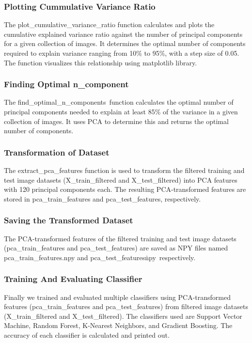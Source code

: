 \documentclass[a4paper]{article}
\theoremstyle{plain}
\theoremstyle{definition}
\begin{document}
        \subsubsection{Plotting Cummulative Variance Ratio}
        The plot\_cumulative\_variance\_ratio function calculates and plots the cumulative explained variance ratio against the number of principal components for a given collection of images. It determines the optimal number of components required to explain variance ranging from 10\% to 95\%, with a step size of 0.05. The function visualizes this relationship using matplotlib library.

        \subsubsection{Finding Optimal n\_component}
        The find\_optimal\_n\_components\ function calculates the optimal number of principal components needed to explain at least 85\% of the variance in a given collection of images. It uses PCA to determine this and returns the optimal number of components.

        \subsubsection{Transformation of Dataset}
        The extract\_pca\_features function is used to transform the filtered training and test image datasets (X\_train\_filtered and X\_test\_filtered) into PCA features with 120 principal components each. The resulting PCA-transformed features are stored in pca\_train\_features and pca\_test\_features, respectively.

        \subsubsection{Saving the Transformed Dataset}
        The PCA-transformed features of the filtered training and test image datasets (pca\_train\_features and pca\_test\_features) are saved as NPY files named pca\_train\_features.npy and pca\_test\_features\.npy\, respectively.

        \subsubsection{Training And Evaluating Classifier}
        Finally we trained and evaluated multiple classifiers using PCA-transformed features (pca\_train\_features and pca\_test\_features) from filtered image datasets (X\_train\_filtered and X\_test\_filtered). The classifiers used are Support Vector Machine, Random Forest, K-Nearest Neighbors, and Gradient Boosting. The accuracy of each classifier is calculated and printed out.
  
\end{document}
